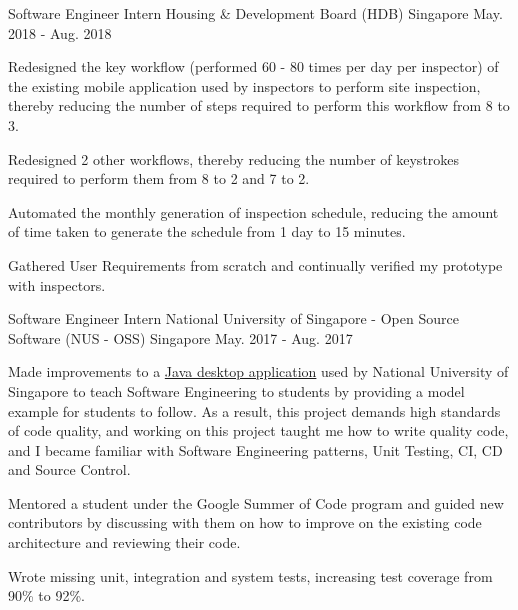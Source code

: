 \begin{cventries}
  \cventry
    {Software Engineer Intern} %
    {Housing \& Development Board (HDB)} %
    {Singapore} %
    {May. 2018 - Aug. 2018} %
    {
      \begin{cvitems} %
        \item {Redesigned the key workflow (performed 60 - 80 times per day per inspector) of the existing mobile application used by inspectors to perform site inspection, thereby reducing the number of steps required to perform this workflow from 8 to 3.}
        \item {Redesigned 2 other workflows, thereby reducing the number of keystrokes required to perform them from 8 to 2 and 7 to 2.}
        \item {Automated the monthly generation of inspection schedule, reducing the amount of time taken to generate the schedule from 1 day to 15 minutes.}
        \item {Gathered User Requirements from scratch and continually verified my prototype with inspectors.}
      \end{cvitems}
    }

  \cventry
    {Software Engineer Intern} %
    {National University of Singapore - Open Source Software (NUS - OSS)} %
    {Singapore} %
    {May. 2017 - Aug. 2017} %
    {
      \begin{cvitems} %
        \item {Made improvements to a \href{https://github.com/issues?utf8=\%E2\%9C\%93&q=repo\%3Ase-edu\%2Faddressbook-level4+involves\%3AZhiyuan-Amos}{Java desktop application} used by National University of Singapore to teach Software Engineering to students by providing a model example for students to follow. As a result, this project demands high standards of code quality, and working on this project taught me how to write quality code, and I became familiar with Software Engineering patterns, Unit Testing, CI, CD and Source Control.}
        \item {Mentored a student under the Google Summer of Code program and guided new contributors by discussing with them on how to improve on the existing code architecture and reviewing their code.}
        \item {Wrote missing unit, integration and system tests, increasing test coverage from 90\% to 92\%.}
      \end{cvitems}
    }


\end{cventries}
